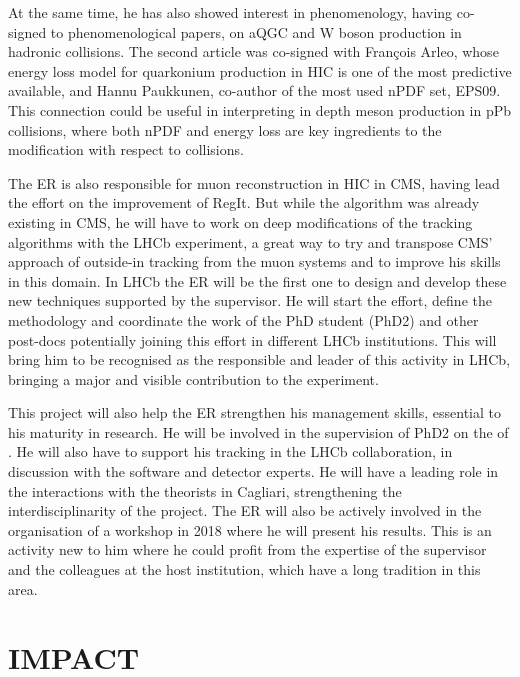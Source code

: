 \documentclass[a4paper,11pt]{article}
\newcommand{\ER}{ER\xspace}
\newcommand{\supervisor}{the supervisor\xspace}
\begin{document}
At the same time, he has also showed interest in phenomenology, having co-signed to phenomenological papers, on aQGC and W boson production in hadronic collisions. The second article was co-signed with François Arleo, whose energy loss model for quarkonium production in HIC is one of the most predictive available, and Hannu Paukkunen, co-author of the most used nPDF set, EPS09. This connection could be useful in interpreting in depth \PgU meson production in pPb collisions, where both nPDF and energy loss are key ingredients to the modification with respect to \pp collisions.

The \ER is also responsible for muon reconstruction in HIC in CMS,
having lead the effort on the improvement of RegIt. But while the
algorithm was already existing in CMS, he will have to work on deep
modifications of the tracking algorithms with the LHCb experiment, a
great way to try and transpose CMS' approach of outside-in tracking
from the muon systems and to improve his skills in this domain. In 
LHCb the \ER will be the first one to design and develop these new
techniques supported by the supervisor. He will start the effort, define 
the methodology and coordinate the work of the PhD student (PhD2) and other 
post-docs potentially joining this effort in different LHCb institutions.
This will bring him to be recognised as the responsible and leader 
of this activity
in LHCb, bringing a major and visible contribution to the experiment.

This project will also help the \ER strengthen his management skills, essential to his maturity in research. He will be involved in the supervision of PhD2 on the \rpa of \PgUabc. He will also have to support his \pbpb tracking in the LHCb collaboration, in discussion with the software and detector experts. He will 
have a leading role in the interactions with the theorists in Cagliari, strengthening the interdisciplinarity of the project. The \ER will also be actively involved in the organisation of a workshop in 2018 where he will present his 
results. This is an activity new to him where he could profit from the 
expertise of \supervisor and the colleagues at the host institution, which 
have a long tradition in this area.

%           

\section{IMPACT}
\label{sec:impact}
\end{document}
